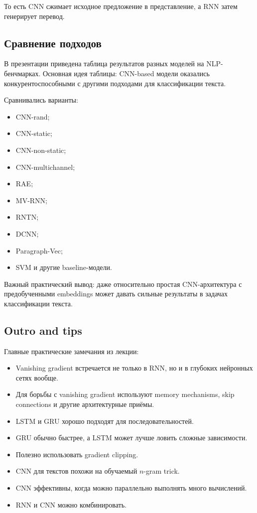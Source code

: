 \documentclass[a4paper,12pt]{article}
\begin{document}
То есть CNN сжимает исходное предложение в представление, а RNN затем генерирует перевод.


\subsection{Сравнение подходов}

В презентации приведена таблица результатов разных моделей на NLP-бенчмарках. Основная идея таблицы: CNN-based модели оказались конкурентоспособными с другими подходами для классификации текста.

Сравнивались варианты:

\begin{itemize}
    \item CNN-rand;
    \item CNN-static;
    \item CNN-non-static;
    \item CNN-multichannel;
    \item RAE;
    \item MV-RNN;
    \item RNTN;
    \item DCNN;
    \item Paragraph-Vec;
    \item SVM и другие baseline-модели.
\end{itemize}

Важный практический вывод: даже относительно простая CNN-архитектура с предобученными embeddings может давать сильные результаты в задачах классификации текста.

\subsection{Outro and tips}

Главные практические замечания из лекции:

\begin{itemize}
    \item Vanishing gradient встречается не только в RNN, но и в глубоких нейронных сетях вообще.
    \item Для борьбы с vanishing gradient используют memory mechanisms, skip connections и другие архитектурные приёмы.
    \item LSTM и GRU хорошо подходят для последовательностей.
    \item GRU обычно быстрее, а LSTM может лучше ловить сложные зависимости.
    \item Полезно использовать gradient clipping.
    \item CNN для текстов похожи на обучаемый \(n\)-gram trick.
    \item CNN эффективны, когда можно параллельно выполнять много вычислений.
    \item RNN и CNN можно комбинировать.
\end{itemize}
\end{document}
